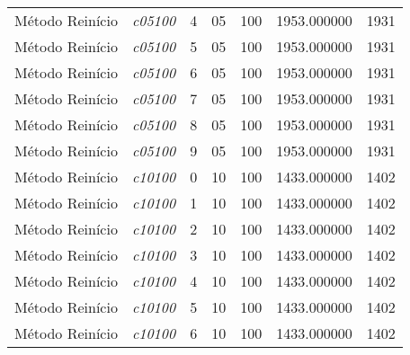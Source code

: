 {\begin{longtable}{cc|c|cc|cc}
			Método Reinício    & \textit{c05100}    & 4                               & 05               & 100              & 1953.000000                          & 1931 \\ 
			Método Reinício    & \textit{c05100}    & 5                               & 05               & 100              & 1953.000000                          & 1931 \\ 
			Método Reinício    & \textit{c05100}    & 6                               & 05               & 100              & 1953.000000                          & 1931 \\ 
			Método Reinício    & \textit{c05100}    & 7                               & 05               & 100              & 1953.000000                          & 1931 \\ 
			Método Reinício    & \textit{c05100}    & 8                               & 05               & 100              & 1953.000000                          & 1931 \\ 
			Método Reinício    & \textit{c05100}    & 9                               & 05               & 100              & 1953.000000                          & 1931 \\ \hline
			Método Reinício    & \textit{c10100}    & 0                               & 10               & 100              & 1433.000000                          & 1402 \\ 
			Método Reinício    & \textit{c10100}    & 1                               & 10               & 100              & 1433.000000                          & 1402 \\ 
			Método Reinício    & \textit{c10100}    & 2                               & 10               & 100              & 1433.000000                          & 1402 \\ 
			Método Reinício    & \textit{c10100}    & 3                               & 10               & 100              & 1433.000000                          & 1402 \\ 
			Método Reinício    & \textit{c10100}    & 4                               & 10               & 100              & 1433.000000                          & 1402 \\ 
			Método Reinício    & \textit{c10100}    & 5                               & 10               & 100              & 1433.000000                          & 1402 \\ 
			Método Reinício    & \textit{c10100}    & 6                               & 10               & 100              & 1433.000000                          & 1402 \\ 

\end{longtable}}
